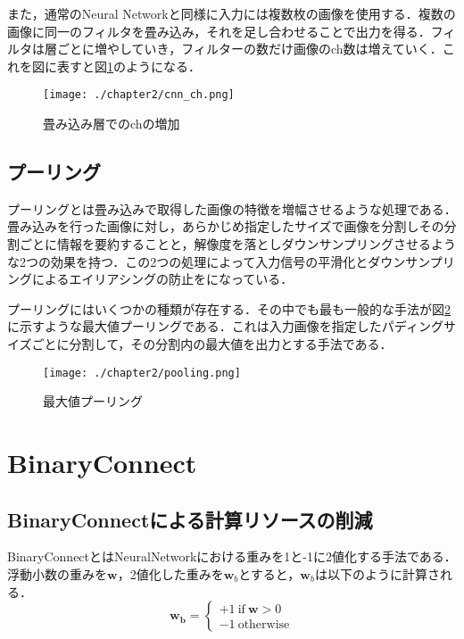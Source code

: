 また，通常のNeural Networkと同様に入力には複数枚の画像を使用する．複数の画像に同一のフィルタを畳み込み，それを足し合わせることで出力を得る．フィルタは層ごとに増やしていき，フィルターの数だけ画像のch数は増えていく．これを図に表すと図\ref{fig_cnn_ch}のようになる．
\begin{figure}[]
  \begin{center}
    \texttt{[image: ./chapter2/cnn\_ch.png]}
    \caption{畳み込み層でのchの増加}
    \label{fig_cnn_ch}
  \end{center}
\end{figure}

\subsection{プーリング}
プーリングとは畳み込みで取得した画像の特徴を増幅させるような処理である．畳み込みを行った画像に対し，あらかじめ指定したサイズで画像を分割しその分割ごとに情報を要約することと，解像度を落としダウンサンプリングさせるような2つの効果を持つ．この2つの処理によって入力信号の平滑化とダウンサンプリングによるエイリアシングの防止をになっている．

プーリングにはいくつかの種類が存在する．その中でも最も一般的な手法が図\ref{fig_pooling}に示すような最大値プーリングである．これは入力画像を指定したパディングサイズごとに分割して，その分割内の最大値を出力とする手法である．
\begin{figure}[]
  \begin{center}
    \texttt{[image: ./chapter2/pooling.png]}
    \caption{最大値プーリング}
    \label{fig_pooling}
  \end{center}
\end{figure}


\section{BinaryConnect}
\subsection{BinaryConnectによる計算リソースの削減}
BinaryConnectとはNeuralNetworkにおける重みを1と-1に2値化する手法である．浮動小数の重みを$\bm{w}$，2値化した重みを$\bm{w}_b$とすると，$\bm{w}_b$は以下のように計算される．
\begin{displaymath}
  \bm{w_{b}} = \left\{ \begin{array}{l}
  \displaystyle 
  +1\:  \text{if}\:  \bm{w} > 0 \\
  -1\:\text{otherwise}
  \end{array} \right.
\end{displaymath}

